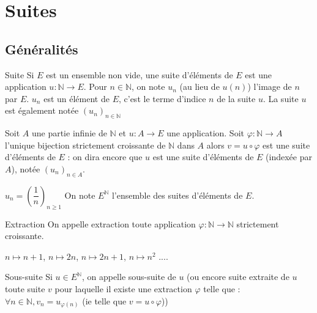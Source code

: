 \documentclass[12pt,a4paper]{report}
\begin{document}
\chapter{Suites}
\section{Généralités}

\begin{definition}{Suite}{}
Si $E$ est un ensemble non vide, une suite d'éléments de $E$ est une application $u : \mathbb{N} \rightarrow E$. Pour $n \in \mathbb{N}$, on note $u_n$ (au lieu de $u(n)$) l'image de $n$ par $E$. $u_n$ est un élément de $E$, c'est le terme d'indice $n$ de la suite $u$. La suite $u$ est également notée $(u_n)_{n \in \mathbb{N}}$
\end{definition}

\begin{remarque}
Soit $A$ une partie infinie de $\mathbb{N}$ et $u : A \rightarrow E$ une application. Soit $\varphi : \mathbb{N} \rightarrow A$ l'unique bijection strictement croissante de $\mathbb{N}$ dans $A$ alors $v = u \circ \varphi$ est une suite d'éléments de $E$ : on dira encore que $u$ est une suite d'éléments de $E$ (indexée par $A$), notée $(u_n)_{n \in A}$. 
\end{remarque}

\begin{exemple}
$u_n = \left(\dfrac{1}{n}\right)_{n \geq 1}$
\newline On note $E^\mathbb{N}$ l'ensemble des suites d'éléments de $E$.
\end{exemple} 

\begin{definition}{Extraction}{}
On appelle extraction toute application $\varphi : \mathbb{N} \rightarrow \mathbb{N}$ strictement croissante.
\end{definition}

\begin{exemple}
$n \mapsto n+1$, $n \mapsto 2n$, $n \mapsto 2n+1$, $n \mapsto n^2$ ....
\end{exemple}

\begin{definition}{Sous-suite}{}
Si $u \in E^\mathbb{N}$, on appelle sous-suite de $u$ (ou encore suite extraite de $u$ toute suite $v$ pour laquelle il existe une extraction $\varphi$ telle que : $\forall n \in \mathbb{N}, v_n = u_{\varphi(n)}$ (ie telle que $v = u \circ \varphi$))
\end{definition}
\end{document}
